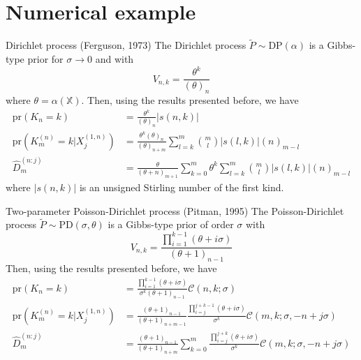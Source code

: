\documentclass[11pt, handout]{beamer}
\begin{document}
\section{Numerical example}

\begin{frame}{Dirichlet process (Ferguson, 1973)}
    The Dirichlet process \(\tilde{P} \sim \text{DP}(\alpha)\) is a Gibbs-type prior for \(\sigma \to 0\) and with
    \begin{equation*}
        V_{n,k} = \frac{\theta^k}{(\theta)_{n}}
    \end{equation*}
    where \(\theta = \alpha(\mathbb{X})\). Then, using the results presented before, we have
    \begin{align*}
        \text{pr}(K_n = k) &= \frac{\theta^k}{(\theta)_{n}} |s(n,k)|\\
        \text{pr}(K_m^{(n)} = k | X_j^{(1,n)}) &= \frac{\theta^k (\theta)_n}{(\theta)_{n + m}} \sum_{l = k}^m \binom{m}{l} |s(l, k)| (n)_{m - l}\\
        \hat{D}_m^{(n:j)} &= \frac{\theta}{(\theta + n)_{m + 1}} \sum_{k = 0}^m \theta^k \sum_{l = k}^{m} \binom{m}{l} |s(l, k)| (n)_{m - l}
    \end{align*}
    where \(|s(n, k)|\) is an unsigned Stirling number of the first kind.
\end{frame}

\begin{frame}{Two-parameter Poisson-Dirichlet process (Pitman, 1995)}
    The Poisson-Dirichlet process \(\tilde{P} \sim \text{PD}(\sigma, \theta)\) is a Gibbs-type prior of order \(\sigma\) with
    \begin{equation*}
        V_{n,k} = \frac{\prod_{i=1}^{k-1}(\theta + i \sigma)}{(\theta + 1)_{n - 1}}
    \end{equation*}
    Then, using the results presented before, we have
    \begin{align*}
        \text{pr}(K_n = k) &= \frac{\prod_{i=1}^{k-1}(\theta + i \sigma)}{\sigma^k (\theta + 1)_{n - 1}} \mathscr{C}(n, k; \sigma)\\
        \text{pr}(K_m^{(n)} = k | X_j^{(1,n)}) &= \frac{(\theta + 1)_{n - 1}}{(\theta + 1)_{n + m - 1}} \frac{\prod_{i=j}^{j+k-1}(\theta + i \sigma)}{\sigma^k} \mathscr{C}(m, k; \sigma, -n + j \sigma)\\
        \hat{D}_m^{(n:j)} &= \frac{(\theta + 1)_{n - 1}}{(\theta + 1)_{n + m}} \sum_{k=0}^m \frac{\prod_{i=j}^{j+k}(\theta + i \sigma)}{\sigma^k} \mathscr{C}(m, k; \sigma, -n + j \sigma)
    \end{align*}
\end{frame}
\end{document}
